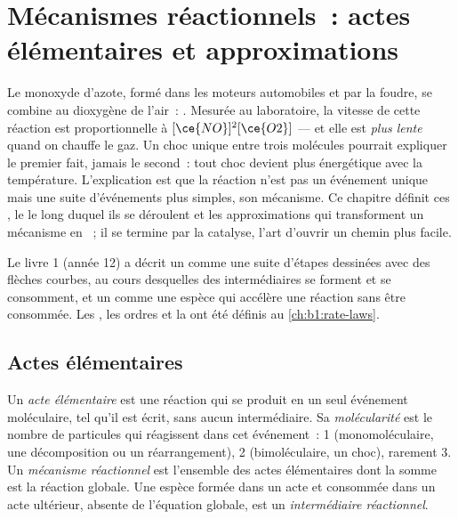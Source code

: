 \chapter{Mécanismes réactionnels~: actes élémentaires et approximations}\label{ch:b1:elementary-steps}

Le monoxyde d'azote, formé dans les moteurs automobiles et par la
foudre, se combine au dioxygène de l'air~: . Mesurée
au laboratoire, la vitesse de cette réaction est proportionnelle à
$[\ce{NO}]^2[\ce{O2}]$ --- et elle est \emph{plus lente} quand on chauffe
le gaz. Un choc unique entre trois molécules pourrait expliquer le
premier fait, jamais le second~: tout choc devient plus énergétique avec
la température. L'explication est que la réaction n'est pas un événement
unique mais une suite d'événements plus simples, son mécanisme. Ce
chapitre définit ces , le  le long
duquel ils se déroulent et les approximations qui transforment un
mécanisme en ~; il se termine par la catalyse, l'art
d'ouvrir un chemin plus facile.

\begin{recall}
Le livre 1 (année 12) a décrit un  comme une suite
d'étapes dessinées avec des flèches courbes, au cours desquelles des
intermédiaires se forment et se consomment, et un  comme une
espèce qui accélère une réaction sans être consommée. Les , les ordres et la  ont été définis au
\cref{ch:b1:rate-laws}.
\end{recall}

\section{Actes élémentaires}

\begin{definition}\label{def:b1:elementary-steps:elementary-step}
Un \emph{acte élémentaire} est une réaction qui se produit en un seul
événement moléculaire, tel qu'il est écrit, sans aucun intermédiaire. Sa
\emph{molécularité} est le nombre de particules qui réagissent dans
cet événement~: 1 (monomoléculaire, une décomposition ou un
réarrangement), 2 (bimoléculaire, un choc), rarement 3. Un
\emph{mécanisme réactionnel} est l'ensemble des actes élémentaires
dont la somme est la réaction globale. Une espèce formée dans un acte et
consommée dans un acte ultérieur, absente de l'équation globale, est un
\emph{intermédiaire réactionnel}.
\end{definition}

